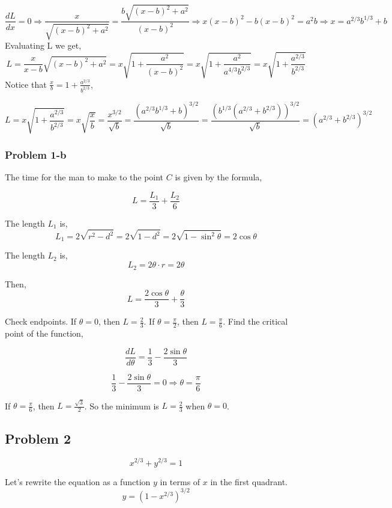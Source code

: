 \documentclass{article}
\begin{document}
\[ \frac{dL}{dx} = 0 \Rightarrow \frac{x}{\sqrt{(x-b)^2+a^2}} = \frac{b\sqrt{(x-b)^2+a^2}}{(x-b)^2} \Rightarrow x(x-b)^2 - b(x-b)^2 = a^2b \Rightarrow x = a^{2/3}b^{1/3} + b\]
Evaluating L we get,
\[ L = \frac{x}{x-b}\sqrt{(x-b)^2+a^2} = x \sqrt{1 + \frac{a^2}{(x-b)^2}} = x\sqrt{1 + \frac{a^2}{a^{4/3}b^{2/3}}} = x\sqrt{1+ \frac{a^{2/3}}{b^{2/3}}} \]
Notice that $\frac{x}{b} = 1 + \frac{a^{2/3}}{b^{2/3}}$,

\[ L = x\sqrt{1 + \frac{a^{2/3}}{b^{2/3}}} = x\sqrt{\frac{x}{b}} = \frac{x^{3/2}}{\sqrt{b}} = \frac{(a^{2/3}b^{1/3} + b)^{3/2}}{\sqrt{b}} = \frac{(b^{1/3}(a^{2/3} + b^{2/3}))^{3/2}}{\sqrt{b}} = (a^{2/3} + b^{2/3})^{3/2} \]

\subsubsection{Problem 1-b}
\begin{figure}[htp!]
    \centering
    
    \label{fig:fig8}
\end{figure}
The time for the man to make to the point $C$ is given by the formula,

\[ L = \frac{L_1}{3} + \frac{L_2}{6} \]

The length $L_1$ is,
\[ L_1 = 2\sqrt{r^2 - d^2} = 2\sqrt{1 - d^2}  = 2 \sqrt{1 - \sin^2{\theta}} = 2\cos{\theta}\]

The length $L_2$ is,
\[ L_2 = 2\theta \cdot r = 2\theta \]

Then,
\[ L = \frac{2\cos{\theta}}{3} + \frac{\theta}{3} \]

Check endpoints. If $\theta = 0$, then $L = \frac{2}{3}$. If $\theta = \frac{\pi}{2}$, then $L = \frac{\pi}{6}$.
Find the critical point of the function,

\[ \frac{dL}{d\theta} = \frac{1}{3} - \frac{2\sin{\theta}}{3} \]

\[ \frac{1}{3} - \frac{2\sin{\theta}}{3} = 0 \Rightarrow \theta = \frac{\pi}{6}\]

If $\theta = \frac{\pi}{6}$, then $L = \frac{\sqrt{3}}{2}$. So the minimum is $L = \frac{2}{3}$ when $\theta = 0$. 

\subsection{Problem 2}
\[ x^{2/3} + y^{2/3} = 1 \]

Let's rewrite the equation as a function $y$ in terms of $x$ in the first quadrant.
\[ y = (1 - x^{2/3})^{3/2} \]
\end{document}
